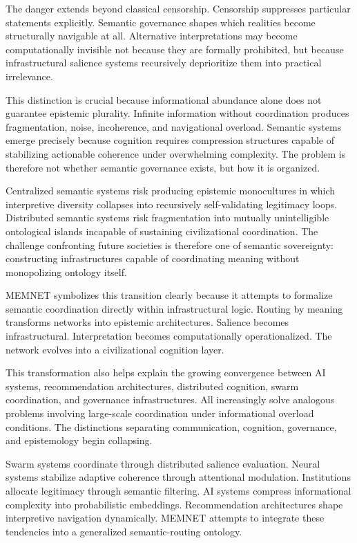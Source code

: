 \documentclass[11pt,a4paper]{article}
\begin{document}
The danger extends beyond classical censorship. Censorship suppresses particular statements explicitly. Semantic governance shapes which realities become structurally navigable at all. Alternative interpretations may become computationally invisible not because they are formally prohibited, but because infrastructural salience systems recursively deprioritize them into practical irrelevance.

This distinction is crucial because informational abundance alone does not guarantee epistemic plurality. Infinite information without coordination produces fragmentation, noise, incoherence, and navigational overload. Semantic systems emerge precisely because cognition requires compression structures capable of stabilizing actionable coherence under overwhelming complexity. The problem is therefore not whether semantic governance exists, but how it is organized.

Centralized semantic systems risk producing epistemic monocultures in which interpretive diversity collapses into recursively self-validating legitimacy loops. Distributed semantic systems risk fragmentation into mutually unintelligible ontological islands incapable of sustaining civilizational coordination. The challenge confronting future societies is therefore one of semantic sovereignty: constructing infrastructures capable of coordinating meaning without monopolizing ontology itself.

MEMNET symbolizes this transition clearly because it attempts to formalize semantic coordination directly within infrastructural logic. Routing by meaning transforms networks into epistemic architectures. Salience becomes infrastructural. Interpretation becomes computationally operationalized. The network evolves into a civilizational cognition layer.

This transformation also helps explain the growing convergence between AI systems, recommendation architectures, distributed cognition, swarm coordination, and governance infrastructures. All increasingly solve analogous problems involving large-scale coordination under informational overload conditions. The distinctions separating communication, cognition, governance, and epistemology begin collapsing.

Swarm systems coordinate through distributed salience evaluation. Neural systems stabilize adaptive coherence through attentional modulation. Institutions allocate legitimacy through semantic filtering. AI systems compress informational complexity into probabilistic embeddings. Recommendation architectures shape interpretive navigation dynamically. MEMNET attempts to integrate these tendencies into a generalized semantic-routing ontology.
\end{document}
